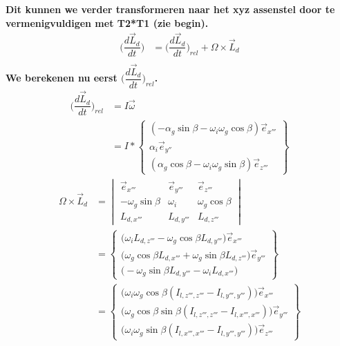 \documentclass[a4paper,10pt]{article}
\begin{document}
\textbf{Dit kunnen we verder transformeren naar het xyz assenstel door te vermenigvuldigen met T2*T1 (zie begin).}
\begin{equation}
\begin{aligned}
	\Big(\dfrac{d\vec{L}_d}{dt}\Big) &= \Big(\dfrac{d\vec{L}_d}{dt}\Big)_{rel} + \Omega \times \vec{L}_d\\
\end{aligned}
\end{equation}
\textbf{We berekenen nu eerst $\Big(\dfrac{d\vec{L}_d}{dt}\Big)_{rel}$.}
\begin{equation}
	\begin{aligned}
		\Big(\dfrac{d\vec{L}_d}{dt}\Big)_{rel} &= I \vec{\omega}\\
		&= I * \begin{Bmatrix}
		(-\alpha_g \sin{\beta} - \omega_i\omega_g\cos{\beta})\vec{e}_{x'''}\\
		\alpha_i\vec{e}_{y''}\\
		(\alpha_g\cos{\beta}-\omega_i\omega_g\sin{\beta})\vec{e}_{z'''}
		\end{Bmatrix}
	\end{aligned}
\end{equation}
\begin{equation}
\begin{aligned}
\Omega \times \vec{L}_d &= \begin{vmatrix}
\vec{e}_{x'''} & \vec{e}_{y'''} & \vec{e}_{z'''}\\
-\omega_g  \sin{\beta} & \omega_i & \omega_g\cos{\beta} \\
L_{d,x'''} & L_{d,y'''}  & L_{d,z'''} 
\end{vmatrix}\\
&= \begin{Bmatrix}
\Big( \omega_i L_{d,z'''} - \omega_g\cos{\beta} L_{d,y'''}  \Big)\vec{e}_{x'''}\\
\Big(\omega_g\cos{\beta} L_{d,x'''} + \omega_g  \sin{\beta} L_{d,z'''}   \Big) \vec{e}_{y'''}\\
\Big( -\omega_g  \sin{\beta} L_{d,y'''} - \omega_i L_{d,x'''} \Big)\end{Bmatrix}\\
&= \begin{Bmatrix}
\Big( \omega_i \omega_g\cos{\beta} (I_{l,z''',z'''} - I_{l,y''',y'''}) \Big) \vec{e}_{x'''}\\
\Big(\omega_g\cos{\beta}\sin{\beta}(I_{l,z''',z'''} - I_{l,x''',x'''})\Big) \vec{e}_{y'''} \\
\Big(\omega_i \omega_g\sin{\beta}(I_{l,x''',x'''} - I_{l,y''',y'''})\Big)\vec{e}_{z'''}
\end{Bmatrix}
\end{aligned}
\end{equation}
\end{document}
